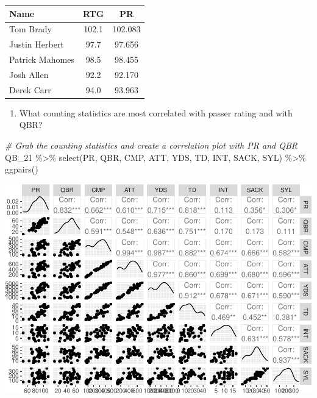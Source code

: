 \documentclass[
  11pt,
]{book}
\newenvironment{Shaded}{\begin{snugshade}}{\end{snugshade}}
\newcommand{\CommentTok}[1]{\textcolor[rgb]{0.56,0.35,0.01}{\textit{#1}}}
\newcommand{\FunctionTok}[1]{\textcolor[rgb]{0.00,0.00,0.00}{#1}}
\newcommand{\NormalTok}[1]{#1}
\newcommand{\SpecialCharTok}[1]{\textcolor[rgb]{0.00,0.00,0.00}{#1}}
\providecommand{\tightlist}{%
  \setlength{\itemsep}{0pt}\setlength{\parskip}{0pt}}
\theoremstyle{definition}
\theoremstyle{definition}
\theoremstyle{definition}
\theoremstyle{definition}
\theoremstyle{remark}
\begin{document}
\begin{table}[H]
\centering
\begin{tabular}{l|c|c}
\hline
Name & RTG & PR\\
\hline
Tom Brady & 102.1 & 102.083\\
\hline
Justin Herbert & 97.7 & 97.656\\
\hline
Patrick Mahomes & 98.5 & 98.455\\
\hline
Josh Allen & 92.2 & 92.170\\
\hline
Derek Carr & 94.0 & 93.963\\
\hline
\end{tabular}
\end{table}

\begin{enumerate}
\def\labelenumi{(\alph{enumi})}
\setcounter{enumi}{1}
\tightlist
\item
  What counting statistics are most correlated with passer rating and with QBR?
\end{enumerate}

\begin{Shaded}
\begin{Highlighting}[]
\CommentTok{\# Grab the counting statistics and create a correlation plot with PR and QBR}
\NormalTok{QB\_21 }\SpecialCharTok{\%\textgreater{}\%}
    \FunctionTok{select}\NormalTok{(PR, QBR, CMP, ATT, YDS, TD, INT, SACK, SYL) }\SpecialCharTok{\%\textgreater{}\%}
    \FunctionTok{ggpairs}\NormalTok{()}
\end{Highlighting}
\end{Shaded}

\includegraphics{series_files/figure-latex/unnamed-chunk-21-1.pdf}
\end{document}

